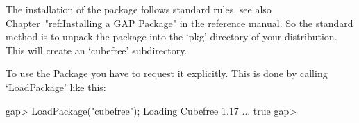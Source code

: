

\null

The installation of the {\Cubefree} package follows standard {\GAP} rules, see
also 
Chapter~"ref:Installing a GAP Package" in the {\GAP} reference manual.
So the standard method is to unpack the package into the `pkg'
directory  of your {\GAP} distribution.  This will create an `cubefree'
subdirectory. 

\null

To use the {\Cubefree} Package you have to request it explicitly. This  is
done by calling `LoadPackage' like this:

\beginexample
gap> LoadPackage("cubefree");
Loading Cubefree 1.17 ...
true
gap>
\endexample


